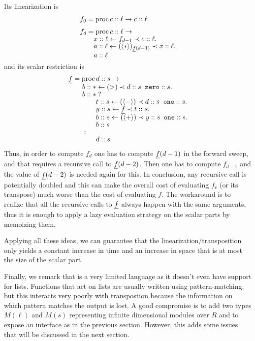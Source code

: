 \begin{itemize}
  Its linearization is 
  \begin{align}
    &f_0 = \operatorname{proc} c::\ell \rightarrow  c::\ell\\[0.5ex]
    \label{eq:mechant-lin}
    &\begin{aligned}
      &f_d = \operatorname{proc} c::\ell \rightarrow\\[-1ex]
      &\qquad x::\ell \leftarrow f_{d-1} \prec c::\ell.\\[-1ex]
      &\qquad a::\ell \leftarrow (\langle*\rangle)_{\underline{f}(d-1)} \prec x::\ell.\\[-1ex]
      &\qquad a::\ell\\[-1ex]
    \end{aligned}
  \end{align}
  and its scalar restriction is
  \begin{equation}
    \begin{aligned}
      &\underline{f} = \operatorname{proc} d::s \rightarrow\\[-1ex]
      &\qquad b::* \leftarrow (>) \prec d::s \;\; \text{\tt zero}::s.\\[-1ex]
      &\qquad b::*\;?\\[-1ex]
      &\qquad\qquad t::s \leftarrow (\langle-\rangle) \prec d::s \;\; \text{\tt one}::s.\\[-1ex]
      &\qquad\qquad y::s \leftarrow \underline{f} \prec t::s.\\[-1ex]
      &\qquad\qquad b::s \leftarrow (\langle+\rangle) \prec y::s\;\;\text{\tt one}::s.\\[-1ex]
      &\qquad\qquad b::s\\[-1ex]
      &\qquad :\\[-1ex]
      &\qquad\qquad d::s
    \end{aligned}
  \end{equation}
  Thus, in order to compute $f_d$ one has to compute $\underline{f}(d-1)$ in
  the forward sweep, and that requires a recursive call to
  $\underline{f}(d-2)$. Then one has to compute $f_{d-1}$ and the value of
  $\underline{f}(d-2)$ is needed again for this. In conclusion, any recursive
  call is potentially doubled and this can make the overall cost of
  evaluating $f_v$ (or its transpose) much worse than the cost of
  evaluating $f$. The workaround is to realize that all the recursive
  calls to $\underline{f}$ always happen with the same arguments, thus it is
  enough to apply a lazy evaluation strategy on the scalar parts by
  memoizing them.
\end{itemize}
Applying all these ideas, we can guarantee that the
linearization/transposition only yields a constant increase in time
and an increase in space that is at most the size of the scalar part

Finally, we remark that \tAL{} is a very limited language as it
doesn't even have support for lists. Functions that act on lists are
usually written using pattern-matching, but this interacts very poorly
with transpostion because the information on which pattern matches the
output is lost. A good compromise is to add two types $M(\ell)$ and
$M(s)$ representing infinite dimensional modules over $R$ and to
expose an interface as in the previous section. However, this adds
some issues that will be discussed in the next section.


%
